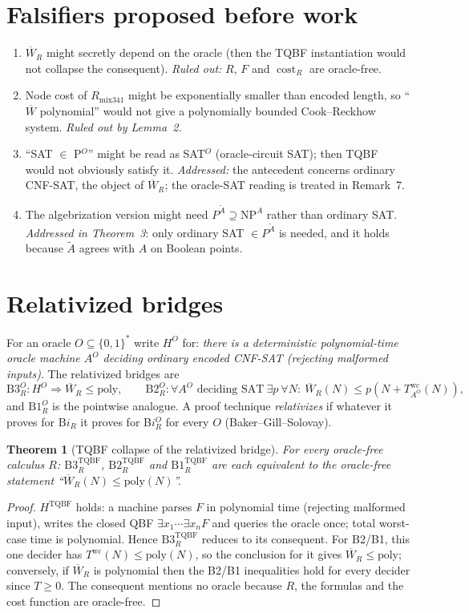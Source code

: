 \documentclass[11pt]{article}
\newtheorem{theorem}{Theorem}
\newcommand{\Wb}{\overline W}
\newcommand{\TQBF}{\mathrm{TQBF}}
\newcommand{\Rmix}{R_{\mathrm{mix341}}}
\begin{document}
\section*{Falsifiers proposed before work}
\begin{enumerate}
\item[F1] $\Wb_R$ might secretly depend on the oracle (then the TQBF instantiation would not
collapse the consequent). \emph{Ruled out:} $R$, $F$ and $\operatorname{cost}_R$ are oracle-free.
\item[F2] Node cost of $\Rmix$ might be exponentially smaller than encoded length, so
``$\Wb$ polynomial'' would not give a polynomially bounded Cook--Reckhow system.
\emph{Ruled out by Lemma~2.}
\item[F3] ``SAT $\in$ P$^O$'' might be read as SAT$^O$ (oracle-circuit SAT); then
TQBF would not obviously satisfy it. \emph{Addressed:} the antecedent concerns ordinary
CNF-SAT, the object of $\Wb_R$; the oracle-SAT reading is treated in Remark~7.
\item[F4] The algebrization version might need $P^{\tilde A}\supseteq \mathrm{NP}^A$
rather than ordinary SAT. \emph{Addressed in Theorem~3}: only ordinary SAT $\in P^{\tilde A}$ is
needed, and it holds because $\tilde A$ agrees with $A$ on Boolean points.
\end{enumerate}

\section{Relativized bridges}
For an oracle $O\subseteq\{0,1\}^*$ write $H^O$ for: \emph{there is a deterministic
polynomial-time oracle machine $A^O$ deciding ordinary encoded CNF-SAT (rejecting
malformed inputs)}. The relativized bridges are
\[
 \mathrm{B3}_R^O: H^O\Rightarrow \Wb_R\le\mathrm{poly},\qquad
 \mathrm{B2}_R^O: \forall A^O\text{ deciding SAT}\ \exists p\ \forall N:\ \Wb_R(N)\le p(N+T^{\mathrm{wc}}_{A^O}(N)),
\]
and $\mathrm{B1}_R^O$ is the pointwise analogue. A proof technique \emph{relativizes} if
whatever it proves for B$i_R$ it proves for B$i_R^O$ for every $O$ (Baker--Gill--Solovay).

\begin{theorem}[TQBF collapse of the relativized bridge]
For every oracle-free calculus $R$: $\mathrm{B3}_R^{\TQBF}$, $\mathrm{B2}_R^{\TQBF}$ and
$\mathrm{B1}_R^{\TQBF}$ are each equivalent to the oracle-free statement
``$\Wb_R(N)\le\mathrm{poly}(N)$''.
\end{theorem}
\begin{proof}
$H^{\TQBF}$ holds: a machine parses $F$ in polynomial time (rejecting malformed input),
writes the closed QBF $\exists x_1\cdots\exists x_n F$ and queries the oracle once; total
worst-case time is polynomial. Hence $\mathrm{B3}^{\TQBF}_R$ reduces to its consequent.
For B2/B1, this one decider has $T^{\mathrm{wc}}(N)\le\mathrm{poly}(N)$, so the conclusion
for it gives $\Wb_R\le\mathrm{poly}$; conversely, if $\Wb_R$ is polynomial then the B2/B1
inequalities hold for every decider since $T\ge 0$. The consequent mentions no oracle
because $R$, the formulas and the cost function are oracle-free.
\end{proof}
\end{document}
